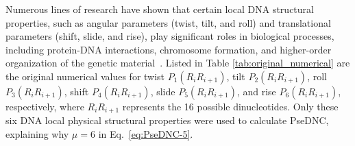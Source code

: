 Numerous lines of research have shown that certain local \gls{DNA} structural properties, such as angular parameters (twist, tilt, and roll) and translational parameters (shift, slide, and rise), play significant roles in biological processes, including protein-\gls{DNA} interactions, chromosome formation, and higher-order organization of the genetic material~\cite{Goni2008DNAlive:Scale,Goni2007DeterminingCalculations}. Listed in Table \ref{tab:original_numerical} are the original numerical values for twist $P_{1}(R_{i}R_{i+1})$⁠, tilt $P_{2}(R_{i}R_{i+1})$⁠, roll $P_{3}(R_{i}R_{i+1})$⁠, shift $P_{4}(R_{i}R_{i+1})$⁠, slide $P_{5}(R_{i}R_{i+1})$⁠, and rise $P_{6}(R_{i}R_{i+1})$⁠, respectively, where $R_{i}R_{i+1}$ represents the 16 possible dinucleotides. Only these six \gls{DNA} local physical structural properties were used to calculate \gls{PseDNC}, explaining why $\mu = 6$ in Eq.~\ref{eq:PseDNC-5}.

